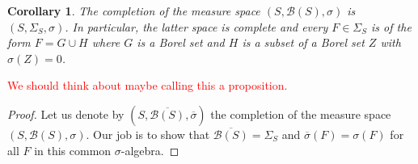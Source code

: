 \documentclass[11pt]{article}
\theoremstyle{theorem}
\newtheorem{corollary}[theorem]{Corollary}
\begin{document}
\begin{corollary}
The completion of the measure space $(S,\mathcal{B}(S),\sigma)$ is $(S,\Sigma_S,\sigma)$. In particular, the latter space is complete and every $F\in \Sigma_S$ is of the form $F=G\cup H$ where $G$ is a Borel set and $H$ is a subset of a Borel set $Z$ with $\sigma(Z)=0$.
\end{corollary}

\textcolor{red}{We should think about maybe calling this a proposition. }
\begin{proof}
Let us denote by $(S,\overline{\mathcal{B}(S)},\overline{\sigma})$ the completion of the measure space $(S,\mathcal{B}(S),\sigma)$. Our job is to show that $\overline{\mathcal{B}(S)}=\Sigma_S$ and $\overline{\sigma}(F)=\sigma(F)$ for all $F$ in this common $\sigma$-algebra. 


\end{proof}
\end{document}
